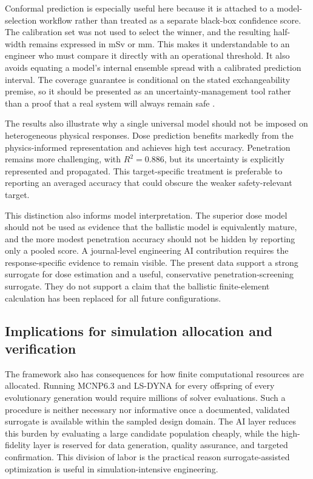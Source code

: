 \documentclass[12pt]{elsarticle}
\begin{document}
	Conformal prediction is especially useful here because it is attached to a model-selection workflow rather than treated as a separate black-box confidence score. The calibration set was not used to select the winner, and the resulting half-width remains expressed in mSv or mm. This makes it understandable to an engineer who must compare it directly with an operational threshold. It also avoids equating a model's internal ensemble spread with a calibrated prediction interval. The coverage guarantee is conditional on the stated exchangeability premise, so it should be presented as an uncertainty-management tool rather than a proof that a real system will always remain safe \cite{Vovk2005Conformal,Lei2018Conformal}.
	
	The results also illustrate why a single universal model should not be imposed on heterogeneous physical responses. Dose prediction benefits markedly from the physics-informed representation and achieves high test accuracy. Penetration remains more challenging, with $R^2=0.886$, but its uncertainty is explicitly represented and propagated. This target-specific treatment is preferable to reporting an averaged accuracy that could obscure the weaker safety-relevant target.
	
	This distinction also informs model interpretation. The superior dose model should not be used as evidence that the ballistic model is equivalently mature, and the more modest penetration accuracy should not be hidden by reporting only a pooled score. A journal-level engineering AI contribution requires the response-specific evidence to remain visible. The present data support a strong surrogate for dose estimation and a useful, conservative penetration-screening surrogate. They do not support a claim that the ballistic finite-element calculation has been replaced for all future configurations.
	
	\subsection{Implications for simulation allocation and verification}
	
	The framework also has consequences for how finite computational resources are allocated. Running MCNP6.3 and LS-DYNA for every offspring of every evolutionary generation would require millions of solver evaluations. Such a procedure is neither necessary nor informative once a documented, validated surrogate is available within the sampled design domain. The AI layer reduces this burden by evaluating a large candidate population cheaply, while the high-fidelity layer is reserved for data generation, quality assurance, and targeted confirmation. This division of labor is the practical reason surrogate-assisted optimization is useful in simulation-intensive engineering.
	
\end{document}
